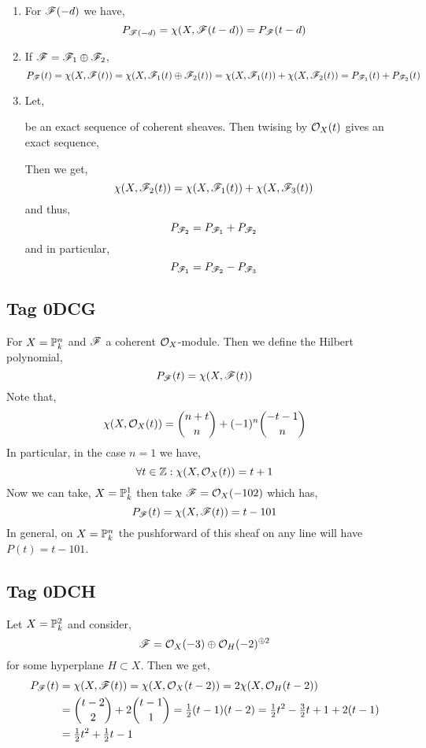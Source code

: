 \documentclass[12pt]{article}
\begin{document}
\begin{enumerate}
\item For $\F(-d)$ we have,
\[ P_{\F(-d)} = \chi(X, \F(t - d)) = P_{\F}(t - d) \]
\item If $\F = \F_1 \oplus \F_2$,
\[ P_\F(t) = \chi(X, \F(t)) = \chi(X, \F_1(t) \oplus \F_2(t)) = \chi(X, \F_1(t)) + \chi(X, \F_2(t)) = P_{\F_1}(t) + P_{\F_2}(t) \]
\item Let,
\begin{center}
\end{center}
be an exact sequence of coherent sheaves. Then twising by $\struct{X}(t)$ gives an exact sequence,
\begin{center}
\end{center}
Then we get,
\[ \chi(X, \F_2(t)) = \chi(X, \F_1(t)) + \chi(X, \F_3(t)) \]
and thus,
\[ P_{\F_2} = P_{\F_1} + P_{\F_2} \]
and in particular,
\[ P_{\F_1} = P_{\F_2} - P_{\F_3} \]
\end{enumerate}


\subsection{Tag 0DCG}

For $X = \P^n_k$ and $\F$ a coherent $\struct{X}$-module. Then we define the Hilbert polynomial,
\[ P_\F(t) = \chi(X, \F(t)) \] Note that,
\[ \chi(X, \struct{X}(t)) = { n + t \choose n } + (-1)^n { - t - 1 \choose n } \]
In particular, in the case $n = 1$ we have, 
\[ \forall t \in \Z : \chi(X, \struct{X}(t)) = t + 1 \]
Now we can take, $X = \P^1_k$ then take $\F = \struct{X}(-102)$ which has,
\[ P_{\F}(t) = \chi(X, \F(t)) = t - 101 \]
In general, on $X = \P^n_k$ the pushforward of this sheaf on any line will have $P(t) = t - 101$.


\subsection{Tag 0DCH}

Let $X = \P^2_k$ and consider,
\[ \F = \struct{X}(-3) \oplus \struct{H}(-2)^{\oplus 2} \]
for some hyperplane $H \subset X$. Then we get,
\begin{align*}
P_{\F}(t) & = \chi(X, \F(t)) = \chi(X, \struct{X}(t - 2)) = 2 \chi(X, \struct{H}(t - 2)) 
\\
& = { t - 2 \choose 2} + 2 { t - 1 \choose 1 } = \tfrac{1}{2}(t - 1) (t - 2) = \tfrac{1}{2} t^2 - \tfrac{3}{2} t + 1 + 2 (t - 1) 
\\
& = \tfrac{1}{2} t^2 + \tfrac{1}{2} t - 1
\end{align*} 
\end{document}
